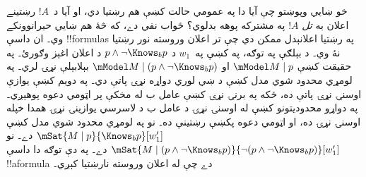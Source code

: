 \documentclass[../../../include/open-logic-section]{subfiles}
\begin{document}
خو ښايي وپوښتو چې آيا دا په عمومي حالت کښې هم رښتيا دي، او آيا
د~$!A$ رښتينے اعلان به \emph{تل} $!A$ په مشترکه پوهه بدلوي؟
ځواب نفي دے، که څۀ هم ښايي حيرانوونکے وي۔ ان داسې !!{formula}s
په رښتيا اعلانېدل ممکن دي چې تر اعلان وروسته نور رښتيا نۀ وي۔
د بېلګې په توګه، په  کښې په~$w_1$
د $p \land \lnot \Knows_b p$ د اعلان اغېز وګورئ۔ په حقيقت کښې
$\mModel M \mid p$ او $\mModel M \mid (p \land \lnot \Knows_b p)$
بېلابېلې نړۍ لري۔ په لومړي محدود شوي مدل کښې د ښي لوري
دواړه نړۍ پاتې دي۔ په دويم کښې يوازې اوسنۍ نړۍ پاتې ده، ځکه
په برنۍ نړۍ کښې عامل ب له مخکې پر اټومي دعوه پوهېږي۔ په دواړو
محدوديتونو کښې له اوسنۍ نړۍ د عامل ب د لاسرسي يوازينۍ نړۍ همدا
خپله اوسنۍ نړۍ ده، او اټومي دعوه پکښې رښتينې ده۔ نو په لومړي
محدود شوي مدل کښې $\mSat{M \mid p}{\Knows_b
p}[w'_1]$ دے۔ نو $\mSat{M \mid (p \land \lnot \Knows_b p)}{\lnot
(p \land \lnot \Knows_b p)}[w'_1]$ دے۔ په دې توګه دا داسې
!!a{formula} دے چې له اعلان وروسته نارښتيا کېږي۔
\end{document}
